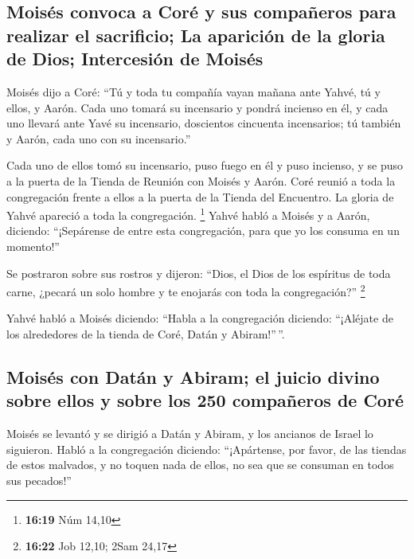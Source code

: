 \hypertarget{moisuxe9s-convoca-a-coruxe9-y-sus-compauxf1eros-para-realizar-el-sacrificio-la-apariciuxf3n-de-la-gloria-de-dios-intercesiuxf3n-de-moisuxe9s}{%
\subsection{Moisés convoca a Coré y sus compañeros para realizar el
sacrificio; La aparición de la gloria de Dios; Intercesión de
Moisés}\label{moisuxe9s-convoca-a-coruxe9-y-sus-compauxf1eros-para-realizar-el-sacrificio-la-apariciuxf3n-de-la-gloria-de-dios-intercesiuxf3n-de-moisuxe9s}}

 Moisés dijo a Coré: ``Tú y toda tu compañía vayan mañana
ante Yahvé, tú y ellos, y Aarón.  Cada uno tomará su
incensario y pondrá incienso en él, y cada uno llevará ante Yavé su
incensario, doscientos cincuenta incensarios; tú también y Aarón, cada
uno con su incensario.''

 Cada uno de ellos tomó su incensario, puso fuego en él y
puso incienso, y se puso a la puerta de la Tienda de Reunión con Moisés
y Aarón.  Coré reunió a toda la congregación frente a
ellos a la puerta de la Tienda del Encuentro. La gloria de Yahvé
apareció a toda la congregación. \footnote{\textbf{16:19} Núm 14,10}
 Yahvé habló a Moisés y a Aarón, diciendo:
 ``¡Sepárense de entre esta congregación, para que yo los
consuma en un momento!''

 Se postraron sobre sus rostros y dijeron: ``Dios, el
Dios de los espíritus de toda carne, ¿pecará un solo hombre y te
enojarás con toda la congregación?'' \footnote{\textbf{16:22} Job 12,10;
  2Sam 24,17}

 Yahvé habló a Moisés diciendo:  ``Habla a
la congregación diciendo: ``¡Aléjate de los alrededores de la tienda de
Coré, Datán y Abiram!''\,''.

\hypertarget{moisuxe9s-con-datuxe1n-y-abiram-el-juicio-divino-sobre-ellos-y-sobre-los-250-compauxf1eros-de-coruxe9}{%
\subsection{Moisés con Datán y Abiram; el juicio divino sobre ellos y
sobre los 250 compañeros de
Coré}\label{moisuxe9s-con-datuxe1n-y-abiram-el-juicio-divino-sobre-ellos-y-sobre-los-250-compauxf1eros-de-coruxe9}}

 Moisés se levantó y se dirigió a Datán y Abiram, y los
ancianos de Israel lo siguieron.  Habló a la congregación
diciendo: ``¡Apártense, por favor, de las tiendas de estos malvados, y
no toquen nada de ellos, no sea que se consuman en todos sus pecados!''

